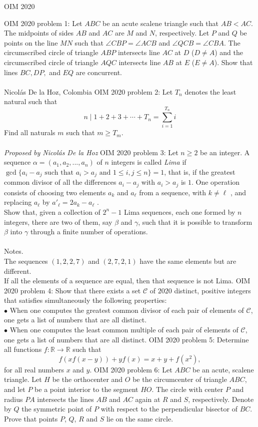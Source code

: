 OIM 2020 

OIM 2020 problem 1:  Let $ABC$ be an acute scalene triangle such that $AB <AC$. The midpoints of sides $AB$ and $AC$ are $M$ and $N$, respectively. Let $P$ and $Q$ be points on the line $MN$ such that $\angle CBP = \angle ACB$ and $\angle QCB = \angle CBA$. The circumscribed circle of triangle $ABP$ intersects line $AC$ at $D$ ($D\ne A$) and the circumscribed circle of triangle $AQC$ intersects line $AB$ at $E$ ($E \ne A$). Show that lines $BC, DP,$ and $EQ$ are concurrent. \\\\
Nicolás De la Hoz, Colombia 
OIM 2020 problem 2:  Let $T_n$ denotes the least natural such that
\[ n\mid 1+2+3+\cdots +T_n=\sum_{i=1}^{T_n} i \]
Find all naturals $m$ such that $m\ge T_m$. \\\\
\textit{Proposed by Nicolás De la Hoz } 
OIM 2020 problem 3:  Let $n\ge 2$ be an integer. A sequence $\alpha = (a_1, a_2,..., a_n)$ of $n$ integers is called \textit{Lima } if $\gcd \{a_i - a_j \text{ such that } a_i> a_j \text{ and } 1\le i, j\le n\} = 1$, that is, if the greatest common divisor of all the differences $a_i - a_j$  with $a_i> a_j$ is $1$. One operation consists of choosing two elements $a_k$ and $a_{\ell}$ from a sequence, with $k\ne \ell $ , and replacing $a_{\ell}$  by $a'_{\ell}  = 2a_k - a_{\ell}$ . \\
Show that, given a collection of $2^n - 1$ Lima sequences, each one formed by $n$ integers, there are two of them, say $\beta$ and $\gamma$, such that it is possible to transform  $\beta$ into  $\gamma$ through a finite number of operations. \\\\
Notes. \\
The sequences $(1,2,2,7)$ and $(2,7,2,1)$ have the same elements but are different. \\
If all the elements of a sequence are equal, then that sequence is not Lima. 
OIM 2020 problem 4:  Show that there exists a set $\mathcal{C}$ of $2020$ distinct, positive integers that satisfies simultaneously the following properties: \\
$\bullet$ When one computes the greatest common divisor of each pair of elements of $\mathcal{C}$, one gets a list of numbers that are all distinct. \\
$\bullet$ When one computes the least common multiple of each pair of elements of $\mathcal{C}$, one gets a list of numbers that are all distinct. 
OIM 2020 problem 5:  Determine all functions $f: \mathbb{R} \rightarrow \mathbb{R}$ such that
\[ f(xf(x-y))+yf(x)=x+y+f(x^2), \]
for all real numbers $x$ and $y.$ 
OIM 2020 problem 6:  Let $ABC$ be an acute, scalene triangle. Let $H$ be the orthocenter and $O$ be the circumcenter of triangle $ABC$, and let $P$ be a point interior to the segment $HO.$ The circle with center $P$ and radius $PA$ intersects the lines $AB$ and $AC$ again at $R$ and $S$, respectively. Denote by $Q$ the symmetric point of $P$ with respect to the perpendicular bisector of $BC$. Prove that points $P$, $Q$, $R$ and $S$ lie on the same circle. 

